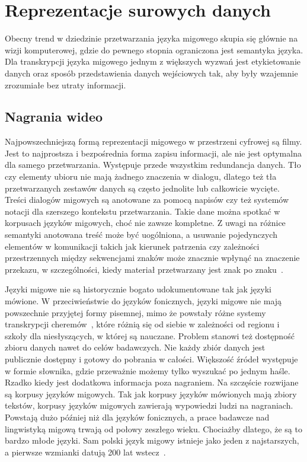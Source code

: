 \section{Reprezentacje surowych danych}
\label{sec:raw-data-representations}

Obecny trend w dziedzinie przetwarzania języka migowego skupia się głównie na wizji komputerowej, gdzie do pewnego stopnia ograniczona jest semantyka języka. Dla transkrypcji języka migowego jednym z większych wyzwań jest etykietowanie danych oraz sposób przedstawienia danych wejściowych tak, aby były wzajemnie zrozumiałe bez utraty informacji.

\subsection{Nagrania wideo}
\label{subsec:video-recordings}

Najpowszechniejszą formą reprezentacji migowego w przestrzeni cyfrowej są filmy. Jest to najprostsza i bezpośrednia forma zapisu informacji, ale nie jest optymalna dla samego przetwarzania. Występuje przede wszystkim redundancja danych. Tło czy elementy ubioru nie mają żadnego znaczenia w dialogu, dlatego też tła przetwarzanych zestawów danych są często jednolite lub całkowicie wycięte. Treści dialogów migowych są anotowane za pomocą napisów czy też systemów notacji dla szerszego kontekstu przetwarzania. Takie dane można spotkać w korpusach języków migowych, choć nie zawsze kompletne. Z uwagi na różnice semantyki anotowana treść może być uogólniona, a usuwanie pojedynczych elementów w komunikacji takich jak kierunek patrzenia czy zależności przestrzennych między sekwencjami znaków może znacznie wpłynąć na znaczenie przekazu, w szczególności, kiedy materiał przetwarzany jest znak po znaku~\cite{yin2020}.

Języki migowe nie są historycznie bogato udokumentowane tak jak języki mówione. W przeciwieństwie do języków fonicznych, języki migowe nie mają powszechnie przyjętej formy pisemnej, mimo że powstały różne systemy transkrypcji cheremów~\cite{stokoe1966}, które różnią się od siebie w zależności od regionu i szkoły dla niesłyszących, w której są nauczane. Problem stanowi też dostępność zbioru danych nawet do celów badawczych. Nie każdy zbiór danych jest publicznie dostępny i gotowy do pobrania w całości. Większość źródeł występuje w formie słownika, gdzie przeważnie możemy tylko wyszukać po jednym haśle. Rzadko kiedy jest dodatkowa informacja poza nagraniem. Na szczęście rozwijane są korpusy języków migowych. Tak jak korpusy języków mówionych mają zbiory tekstów, korpusy języków migowych zawierają wypowiedzi ludzi na nagraniach. Powstają dużo później niż dla języków fonicznych, a prace badawcze nad lingwistyką migową trwają od połowy zeszłego wieku. Chociażby dlatego, że są to bardzo młode języki. Sam polski język migowy istnieje jako jeden z najstarszych, a pierwsze wzmianki datują 200 lat wstecz~\cite{hollak1879}.

